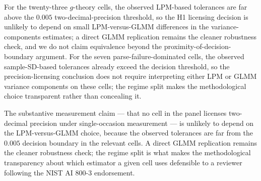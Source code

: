 \documentclass[11pt]{article}
\begin{document}
For the twenty-three $g$-theory cells, the observed LPM-based tolerances are far above the $0.005$ two-decimal-precision threshold, so the H1 licensing decision is unlikely to depend on small LPM-versus-GLMM differences in the variance-components estimates; a direct GLMM replication remains the cleaner robustness check, and we do not claim equivalence beyond the proximity-of-decision-boundary argument. For the seven parse-failure-dominated cells, the observed sample-SD-based tolerances already exceed the decision threshold, so the precision-licensing conclusion does not require interpreting either LPM or GLMM variance components on these cells; the regime split makes the methodological choice transparent rather than concealing it.

The substantive measurement claim --- that no cell in the panel licenses two-decimal precision under single-occasion measurement --- is unlikely to depend on the LPM-versus-GLMM choice, because the observed tolerances are far from the $0.005$ decision boundary in the relevant cells. A direct GLMM replication remains the cleaner robustness check; the regime split is what makes the methodological transparency about which estimator a given cell uses defensible to a reviewer following the NIST AI 800-3 endorsement.




\end{document}
